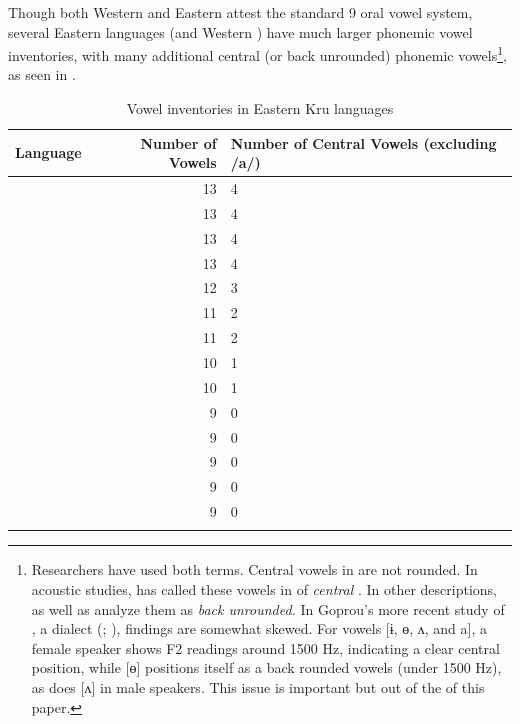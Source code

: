 \documentclass[output=paper,newtxmath,modfonts,nonflat]{langsci/langscibook}
\begin{document}
Though both Western and Eastern  attest the standard 9 oral vowel system, several Eastern  languages (and Western ) have much larger phonemic vowel inventories, with many additional central (or back unrounded) phonemic vowels\footnote{Researchers have used both terms.  Central vowels in  are not rounded. In acoustic studies, \citet{grégoire1972} has called these vowels in  of  \textit{central} \citep[see also][15]{Zogbo1981}. In other descriptions, \citet[61]{Werle1976} as well as \citet[7]{kipre2005} analyze them as \textit{back unrounded.} In Goprou’s more recent study of , a  dialect (\citeyear{Goprou2010}; \citeyear[177]{Goprou2014}), findings are somewhat skewed. For vowels [ɨ, ɵ, ʌ, and a], a female speaker shows F2 readings around 1500 Hz, indicating a clear central position, while [ɵ] positions itself as a back rounded vowels (under 1500 Hz), as does [ʌ] in male speakers. This issue is important but out of the  of this paper.}, as seen in .

\begin{table}
\small
\begin{tabularx}{\textwidth}{l@{}rR{6.8cm}}
\lsptoprule
\textbf{Language} & \textbf{Number of Vowels} & \textbf{Number of Central Vowels (excluding /a/)}\\
\midrule
{} & 13 & 4\\
 & 13 & 4\\
  & 13 & 4\\
 & 13 & 4\\
  & 12 & 3\\
 & 11 & 2\\
 & 11 & 2\\
 & 10 & 1\\
 & 10 & 1\\
 & 9 & 0\\
 & 9 & 0\\
 & 9 & 0\\
 & 9 & 0\\
 & 9 & 0\\          
\lspbottomrule
\end{tabularx}
\caption{Vowel inventories in Eastern Kru languages}
\label{tab:zogbo:4}
\end{table}
\end{document}
